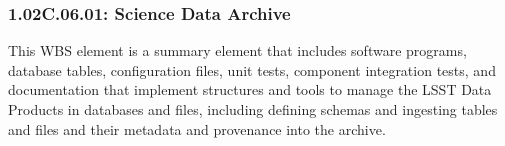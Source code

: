 \subsubsection{1.02C.06.01: Science Data Archive}

This WBS element is a summary element that includes software programs, database tables, configuration files, unit tests, component integration tests, and documentation that implement structures and tools to manage the LSST Data Products in databases and files, including defining schemas and ingesting tables and files and their metadata and provenance into the archive.
